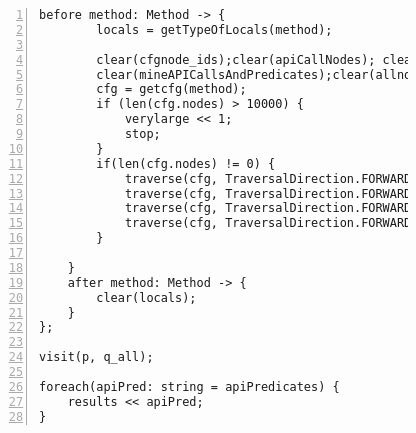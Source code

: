 \begin{figure}[ht!]
\begin{lstlisting}[numbers=left, tabsize=4, escapechar=@, caption={API Precondition Mining Analysis},label={lst:apm-code}, lastline = 10]
	before method: Method -> {
	    locals = getTypeOfLocals(method);
	    
		clear(cfgnode_ids);clear(apiCallNodes); clear(predicateExprsAtNodes);
		clear(mineAPICallsAndPredicates);clear(allnode_ids);clear(cfg_dom); clear(dom_result);
		cfg = getcfg(method);
		if (len(cfg.nodes) > 10000) {
		    verylarge << 1;
		    stop;
		}
		if(len(cfg.nodes) != 0) {
		    traverse(cfg, TraversalDirection.FORWARD, TraversalKind.HYBRID, mineAPICallsAndPredicates);
			traverse(cfg, TraversalDirection.FORWARD, TraversalKind.HYBRID, allnode_ids);
			traverse(cfg, TraversalDirection.FORWARD, TraversalKind.HYBRID, cfg_dom, fixp1);
            traverse(cfg, TraversalDirection.FORWARD, TraversalKind.HYBRID, dom_result);
		}

	}
    after method: Method -> {
	    clear(locals);    
	}
};

visit(p, q_all);

foreach(apiPred: string = apiPredicates) {
    results << apiPred;                
}
\end{lstlisting}
\end{figure}